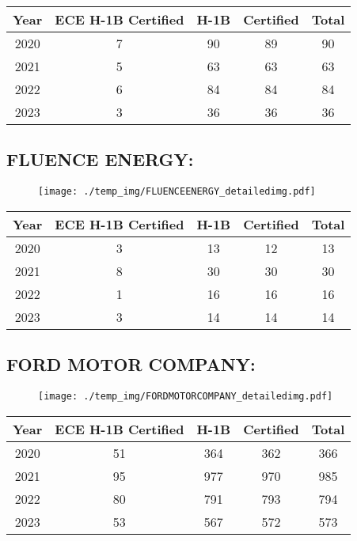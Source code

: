 \documentclass{article}%
\begin{document}
%
\begin{longtable}{c|c|c|c|c}%
\hline%
Year&ECE H{-}1B Certified&H{-}1B&Certified&Total\\%
\hline%
2020&7&90&89&90\\%
\hline%
2021&5&63&63&63\\%
\hline%
2022&6&84&84&84\\%
\hline%
2023&3&36&36&36\\%
\hline%
\end{longtable}

%
\newpage%
\subsection{FLUENCE ENERGY:}%
\label{subsec:FLUENCEENERGY}%
\label{FLUENCEENERGYdetailed}%


\begin{figure}[htbp]%
\centering%
\texttt{[image: ./temp\_img/FLUENCEENERGY\_detailedimg.pdf]}%
\end{figure}

%
\begin{longtable}{c|c|c|c|c}%
\hline%
Year&ECE H{-}1B Certified&H{-}1B&Certified&Total\\%
\hline%
2020&3&13&12&13\\%
\hline%
2021&8&30&30&30\\%
\hline%
2022&1&16&16&16\\%
\hline%
2023&3&14&14&14\\%
\hline%
\end{longtable}

%
\newpage%
\subsection{FORD MOTOR COMPANY:}%
\label{subsec:FORDMOTORCOMPANY}%
\label{FORDMOTORCOMPANYdetailed}%


\begin{figure}[htbp]%
\centering%
\texttt{[image: ./temp\_img/FORDMOTORCOMPANY\_detailedimg.pdf]}%
\end{figure}

%
\begin{longtable}{c|c|c|c|c}%
\hline%
Year&ECE H{-}1B Certified&H{-}1B&Certified&Total\\%
\hline%
2020&51&364&362&366\\%
\hline%
2021&95&977&970&985\\%
\hline%
2022&80&791&793&794\\%
\hline%
2023&53&567&572&573\\%
\hline%
\end{longtable}
\end{document}
